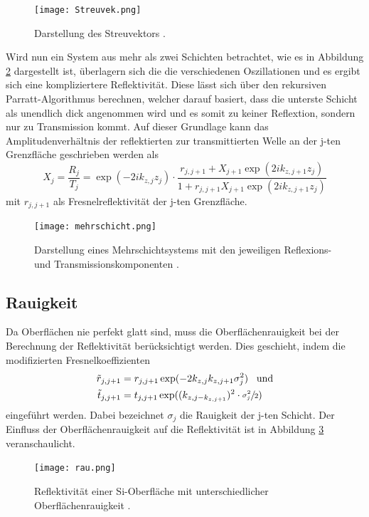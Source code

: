 \begin{figure}
  \centering
  \texttt{[image: Streuvek.png]}
  \caption{Darstellung des Streuvektors \cite{XSR}.}
  \label{fig:Streuvek}
\end{figure}


Wird nun ein System aus mehr als zwei Schichten betrachtet, wie es in Abbildung \ref{fig:mehrschicht} dargestellt ist, überlagern
sich die die verschiedenen Oszillationen und es ergibt sich eine kompliziertere Reflektivität. Diese lässt sich über den rekursiven
Parratt-Algorithmus berechnen, welcher darauf basiert, dass die unterste Schicht als unendlich dick angenommen wird und es somit zu keiner
Reflextion, sondern nur zu Transmission kommt.
Auf dieser Grundlage kann das Amplitudenverhältnis der reflektierten zur transmittierten Welle an der j-ten Grenzfläche geschrieben werden als
\begin{equation}
  X_j=\frac{R_j}{T_j}=\exp(-2ik_{z,j}z_j)\cdot\frac{r_{j,j+1}+X_{j+1}\exp(2ik_{z,j+1}z_j)}{1+r_{j,j+1}X_{j+1}\exp(2ik_{z,j+1}z_j)}
  \label{eqn:parratt}
\end{equation}
mit $r_{j,j+1}$ als Fresnelreflektivität der j-ten Grenzfläche.

\begin{figure}[H]
  \centering
  \texttt{[image: mehrschicht.png]}
  \caption{Darstellung eines Mehrschichtsystems mit den jeweiligen Reflexions- und Transmissionskomponenten \cite{skript}.}
  \label{fig:mehrschicht}
\end{figure}

\subsection{Rauigkeit}
Da Oberflächen nie perfekt glatt sind, muss die Oberflächenrauigkeit bei der Berechnung der Reflektivität berücksichtigt werden. Dies
geschieht, indem die modifizierten Fresnelkoeffizienten
\begin{align}
  \tilde{r}_{j,j+1}&=r_{j,j+1}\exp(-2k_{z,j}k_{z,j+1}\sigma^2_j)\;\;\;\text{und}\\
  \tilde{t}_{j,j+1}&=t_{j,j+1}\exp((k_{z,j-k_{z,j+1}})^2\cdot\sfrac{\sigma^2_j}{2})
\end{align}
eingeführt werden. Dabei bezeichnet $\sigma_j$ die Rauigkeit der j-ten Schicht.
Der Einfluss der Oberflächenrauigkeit auf die Reflektivität ist in Abbildung \ref{fig:rau} veranschaulicht.

\begin{figure}
  \centering
  \texttt{[image: rau.png]}
  \caption{Reflektivität einer Si-Oberfläche mit unterschiedlicher Oberflächenrauigkeit \cite{XSR}.}
  \label{fig:rau}
\end{figure}
